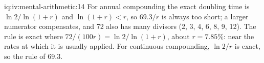 \begin{solution}{iq:iv:mental-arithmetic:14}
For annual compounding the exact doubling time is $\ln 2/\ln(1 + r)$ and $\ln(1+r) < r$, so $69.3/r$ is always
too short; a larger numerator compensates, and 72 also has many divisors (2, 3, 4, 6, 8, 9, 12). The rule is
exact where $72/(100r) = \ln 2/\ln(1+r)$, about $r = 7.85\%$: near the rates at which it is usually applied.
For continuous compounding, $\ln 2/r$ is exact, so the rule of 69.3.
\end{solution}
